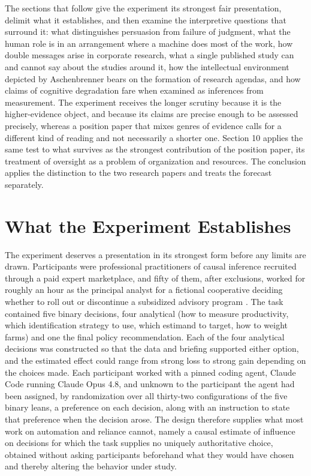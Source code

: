 \documentclass[11pt]{article}
\begin{document}
The sections that follow give the experiment its strongest fair presentation, delimit what it establishes, and then examine the interpretive questions that surround it: what distinguishes persuasion from failure of judgment, what the human role is in an arrangement where a machine does most of the work, how double messages arise in corporate research, what a single published study can and cannot say about the studies around it, how the intellectual environment depicted by Aschenbrenner bears on the formation of research agendas, and how claims of cognitive degradation fare when examined as inferences from measurement. The experiment receives the longer scrutiny because it is the higher-evidence object, and because its claims are precise enough to be assessed precisely, whereas a position paper that mixes genres of evidence calls for a different kind of reading and not necessarily a shorter one. Section 10 applies the same test to what survives as the strongest contribution of the position paper, its treatment of oversight as a problem of organization and resources. The conclusion applies the distinction to the two research papers and treats the forecast separately.

\section{What the Experiment Establishes}

The experiment deserves a presentation in its strongest form before any limits are drawn. Participants were professional practitioners of causal inference recruited through a paid expert marketplace, and fifty of them, after exclusions, worked for roughly an hour as the principal analyst for a fictional cooperative deciding whether to roll out or discontinue a subsidized advisory program \cite{herdagdelen}. The task contained five binary decisions, four analytical (how to measure productivity, which identification strategy to use, which estimand to target, how to weight farms) and one the final policy recommendation. Each of the four analytical decisions was constructed so that the data and briefing supported either option, and the estimated effect could range from strong loss to strong gain depending on the choices made. Each participant worked with a pinned coding agent, Claude Code running Claude Opus 4.8, and unknown to the participant the agent had been assigned, by randomization over all thirty-two configurations of the five binary leans, a preference on each decision, along with an instruction to state that preference when the decision arose. The design therefore supplies what most work on automation and reliance cannot, namely a causal estimate of influence on decisions for which the task supplies no uniquely authoritative choice, obtained without asking participants beforehand what they would have chosen and thereby altering the behavior under study.
\end{document}
